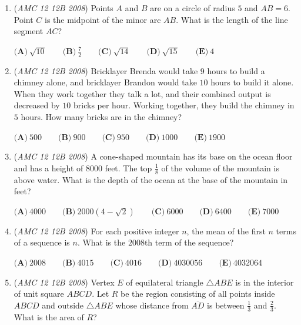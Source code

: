 \begin{enumerate}
 $\textbf{(A)}\ \frac {1}{36} \qquad \textbf{(B)}\ \frac {1}{13} \qquad \textbf{(C)}\ \frac {1}{10} \qquad \textbf{(D)}\ \frac {5}{36} \qquad \textbf{(E)}\ \frac {1}{5}$


	\item (\textit{AMC 12 12B 2008}) Points $A$ and $B$ are on a circle of radius $5$ and $AB = 6$. Point $C$ is the midpoint of the minor arc $AB$. What is the length of the line segment $AC$?


 $\textbf{(A)}\ \sqrt {10} \qquad \textbf{(B)}\ \frac {7}{2} \qquad \textbf{(C)}\ \sqrt {14} \qquad \textbf{(D)}\ \sqrt {15} \qquad \textbf{(E)}\ 4$


	\item (\textit{AMC 12 12B 2008}) Bricklayer Brenda would take $9$ hours to build a chimney alone, and bricklayer Brandon would take $10$ hours to build it alone. When they work together they talk a lot, and their combined output is decreased by $10$ bricks per hour. Working together, they build the chimney in $5$ hours. How many bricks are in the chimney?


 $\textbf{(A)}\ 500 \qquad \textbf{(B)}\ 900 \qquad \textbf{(C)}\ 950 \qquad \textbf{(D)}\ 1000 \qquad \textbf{(E)}\ 1900$


	\item (\textit{AMC 12 12B 2008}) A cone-shaped mountain has its base on the ocean floor and has a height of 8000 feet. The top $\frac{1}{8}$ of the volume of the mountain is above water. What is the depth of the ocean at the base of the mountain in feet?


 $\textbf{(A)}\ 4000 \qquad \textbf{(B)}\ 2000(4-\sqrt{2}) \qquad \textbf{(C)}\ 6000 \qquad \textbf{(D)}\ 6400 \qquad \textbf{(E)}\ 7000$


	\item (\textit{AMC 12 12B 2008}) For each positive integer $n$, the mean of the first $n$ terms of a sequence is $n$. What is the $2008$th term of the sequence?


 $\textbf{(A)}\ 2008 \qquad \textbf{(B)}\ 4015 \qquad \textbf{(C)}\ 4016 \qquad \textbf{(D)}\ 4030056 \qquad \textbf{(E)}\ 4032064$


	\item (\textit{AMC 12 12B 2008}) Vertex $E$ of equilateral triangle $\triangle ABE$ is in the interior of unit square $ABCD$. Let $R$ be the region consisting of all points inside $ABCD$ and outside $\triangle ABE$ whose distance from $\overline{AD}$ is between $\frac{1}{3}$ and $\frac{2}{3}$. What is the area of $R$?



\end{enumerate}
